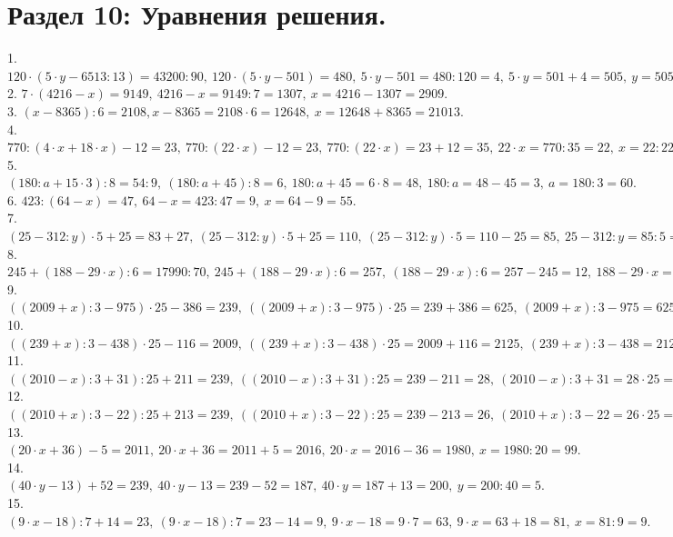 \documentclass[12pt]{article}
\begin{document}
\section{Раздел 10: Уравнения решения.}
1. $120\cdot(5\cdot y-6513:13)=43200:90,\ 120\cdot(5\cdot y-501)=480,\ 5\cdot y-501=480:120=4,\ 5\cdot y=501+4=505,\ y=505:5=101.$\\
2. $7\cdot(4216-x)=9149,\ 4216-x=9149:7=1307,\ x=4216-1307=2909.$\\
3. $(x-8365):6=2108, x-8365=2108\cdot6=12648,\ x=12648+8365=21013.$\\
4. $770:(4\cdot x+18\cdot x)-12=23,\ 770:(22\cdot x)-12=23,\ 770:(22\cdot x)=23+12=35,\ 22\cdot x=770:35=22,\ x=22:22=1.$\\
5. $(180:a+15\cdot3):8=54:9,\ (180:a+45):8=6,\ 180:a+45=6\cdot8=48,\ 180:a=48-45=3,\ a=180:3=60.$\\
6. $423:(64-x)=47,\ 64-x=423:47=9,\ x=64-9=55.$\\
7. $(25-312:y)\cdot5+25=83+27,\ (25-312:y)\cdot5+25=110,\ (25-312:y)\cdot5=110-25=85,\ 25-312:y=85:5=17,\ 312:y=25-17=8,\ y=312:8=39.$\\
8. $245+(188-29\cdot x):6=17990:70,\ 245+(188-29\cdot x):6=257,\ (188-29\cdot x):6=257-245=12,\ 188-29\cdot x=6\cdot12=72,\ 29\cdot x=188-72=116,\ x=116:29=4.$\\
9. $((2009+x):3-975)\cdot25-386=239,\ ((2009+x):3-975)\cdot25=239+386=625,\ (2009+x):3-975=625:25=25,\ (2009+x):3=25+975=1000,\ 2009+x=3\cdot1000=3000,\ x=3000-2009=991.$\\
10. $((239+x):3-438)\cdot25-116=2009,\ ((239+x):3-438)\cdot25=2009+116=2125,\ (239+x):3-438=2125:25=85,\ (239+x):3=438+85=523,\ 239+x=523\cdot3=1569,\ x=1569-239=1330.$\\
11. $((2010-x):3+31):25+211=239,\ ((2010-x):3+31):25=239-211=28,\ (2010-x):3+31=28\cdot25=700,\ (2010-x):3=700-31=669,\ 2010-x=669\cdot3=2007,\ x=2010-2007=3.$\\
12. $((2010+x):3-22):25+213=239,\ ((2010+x):3-22):25=239-213=26,\ (2010+x):3-22=26\cdot25=650,\ (2010+x):3=650+22=672,\ 2010+x=672\cdot3=2016,\ x=2016-2010=6.$\\
13. $(20\cdot x+36)-5=2011,\ 20\cdot x+36=2011+5=2016,\ 20\cdot x=2016-36=1980,\ x=1980:20=99.$\\
14. $(40\cdot y-13)+52=239,\ 40\cdot y-13=239-52=187,\ 40\cdot y=187+13=200,\ y=200:40=5.$\\
15. $(9\cdot x-18):7+14=23,\ (9\cdot x-18):7=23-14=9,\ 9\cdot x-18=9\cdot7=63,\ 9\cdot x=63+18=81,\ x=81:9=9.$\\
\end{document}
